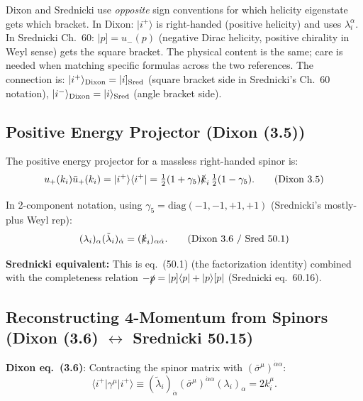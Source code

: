 \begin{remark}
Dixon and Srednicki use \emph{opposite} sign conventions for which helicity eigenstate gets
which bracket. In Dixon: $|i^+\rangle$ is right-handed (positive helicity) and uses $\lambda_i^\alpha$.
In Srednicki Ch.~60: $|p]=u_-(p)$ (negative Dirac helicity, positive chirality in Weyl sense)
gets the square bracket. The physical content is the same; care is needed when matching specific
formulas across the two references. The connection is:
$|i^+\rangle_{\rm Dixon} = |i]_{\rm Sred}$ (square bracket side in Srednicki's Ch.~60 notation),
$|i^-\rangle_{\rm Dixon} = |i\rangle_{\rm Sred}$ (angle bracket side).
\end{remark}

\subsection{Positive Energy Projector (Dixon (3.5))}

The positive energy projector for a massless right-handed spinor is:
\begin{equation}
  u_+(k_i)\bar{u}_+(k_i) = |i^+\rangle\langle i^+|
  = \tfrac{1}{2}(1+\gamma_5)\slashed{k}_i\,\tfrac{1}{2}(1-\gamma_5).
  \tag{Dixon 3.5}
\end{equation}

In 2-component notation, using $\gamma_5 = \mathrm{diag}(-1,-1,+1,+1)$ (Srednicki's mostly-plus Weyl rep):
\begin{equation}
  (\lambda_i)_\alpha(\tilde\lambda_i)_{\dot\alpha} = (\slashed{k}_i)_{\alpha\dot\alpha}.
  \tag{Dixon 3.6 / Sred 50.1}
\end{equation}

\textbf{Srednicki equivalent:} This is eq.~(50.1) (the factorization identity) combined with
the completeness relation $-\slashed{p}=|p]\langle p|+|p\rangle[p|$ (Srednicki eq.~60.16).

\subsection{Reconstructing 4-Momentum from Spinors (Dixon (3.6) $\leftrightarrow$ Srednicki 50.15)}

\textbf{Dixon eq.~(3.6)}: Contracting the spinor matrix with $(\bar\sigma^\mu)^{\dot\alpha\alpha}$:
\begin{equation}
  \langle i^+|\gamma^\mu|i^+\rangle
  \equiv (\tilde\lambda_i)_{\dot\alpha}(\bar\sigma^\mu)^{\dot\alpha\alpha}(\lambda_i)_\alpha
  = 2k_i^\mu.
  \tag{Dixon 3.6}
\end{equation}

